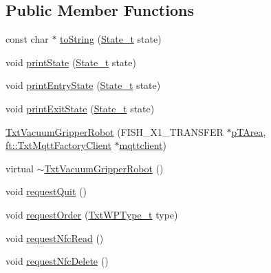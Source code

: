\subsection*{Public Member Functions}
\begin{DoxyCompactItemize}
\item 
const char $\ast$ \hyperlink{classft_1_1_txt_vacuum_gripper_robot_acfdbf8ef23222b97fab8e712e69eb186}{to\+String} (\hyperlink{classft_1_1_txt_vacuum_gripper_robot_a44b86628599c6f40dd9f709fef647211}{State\+\_\+t} state)
\item 
void \hyperlink{classft_1_1_txt_vacuum_gripper_robot_a1342208c4d081f3977edc7588761a08a}{print\+State} (\hyperlink{classft_1_1_txt_vacuum_gripper_robot_a44b86628599c6f40dd9f709fef647211}{State\+\_\+t} state)
\item 
void \hyperlink{classft_1_1_txt_vacuum_gripper_robot_af251097dd5c111e90c51bfef9813afe7}{print\+Entry\+State} (\hyperlink{classft_1_1_txt_vacuum_gripper_robot_a44b86628599c6f40dd9f709fef647211}{State\+\_\+t} state)
\item 
void \hyperlink{classft_1_1_txt_vacuum_gripper_robot_a1aa567d609b0576f2858877331b3c304}{print\+Exit\+State} (\hyperlink{classft_1_1_txt_vacuum_gripper_robot_a44b86628599c6f40dd9f709fef647211}{State\+\_\+t} state)
\item 
\hyperlink{classft_1_1_txt_vacuum_gripper_robot_a5f66324b385d19e91bfd7499a09ae324}{Txt\+Vacuum\+Gripper\+Robot} (F\+I\+S\+H\+\_\+\+X1\+\_\+\+T\+R\+A\+N\+S\+F\+ER $\ast$\hyperlink{classft_1_1_txt_simulation_model_a9facd66a0dbecd676ae7b72c37a0b300}{p\+T\+Area}, \hyperlink{classft_1_1_txt_mqtt_factory_client}{ft\+::\+Txt\+Mqtt\+Factory\+Client} $\ast$\hyperlink{classft_1_1_txt_simulation_model_a6a92fdef8619b9b1636c7c464091ea3a}{mqttclient})
\item 
virtual \hyperlink{classft_1_1_txt_vacuum_gripper_robot_a2df0a8b0b187be91d7da8650ab8d8283}{$\sim$\+Txt\+Vacuum\+Gripper\+Robot} ()
\item 
void \hyperlink{classft_1_1_txt_vacuum_gripper_robot_aeccf0b1fc210d8d866da8fbf790bbc93}{request\+Quit} ()
\item 
void \hyperlink{classft_1_1_txt_vacuum_gripper_robot_a009cde0e105a105b2e9d67c38a39e865}{request\+Order} (\hyperlink{namespaceft_a2d5bf01b2da29de3c061682f3195b5b2}{Txt\+W\+P\+Type\+\_\+t} type)
\item 
void \hyperlink{classft_1_1_txt_vacuum_gripper_robot_ac52e075633605da3c6e4f2bcbb0f823c}{request\+Nfc\+Read} ()
\item 
void \hyperlink{classft_1_1_txt_vacuum_gripper_robot_a3fc5ddb2d9a4d4556dbd7f3f43021d9b}{request\+Nfc\+Delete} ()

\end{DoxyCompactItemize}
